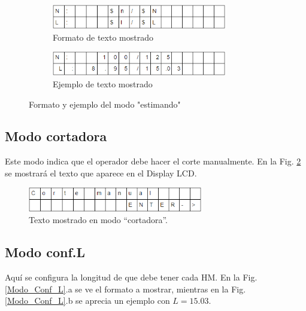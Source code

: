 \documentclass[main_conf.tex]{subfiles}
\begin{document}
\begin{figure}[t]
  \centering
  \begin{subfigure}[b]{0.5\textwidth}
    \centering
    \includegraphics[width=3.0in]{../img/modo/estimando_view.png}
    \caption{Formato de texto mostrado}
  \end{subfigure}

  \begin{subfigure}[b]{0.5\textwidth}
    \centering
    \includegraphics[width=3.0in]{../img/modo/estimando_sample.png}
    \caption{Ejemplo de texto mostrado}
  \end{subfigure}

  \caption{Formato y ejemplo del modo "estimando"}
  \label{Modo_estimando}
\end{figure}

\subsection{Modo cortadora}
Este modo indica que el operador debe hacer el corte manualmente.
En la Fig. \ref{Modo_cortadora} se mostrará el texto que
aparece en el Display LCD.

\begin{figure}[!t]
  \centering
  \includegraphics[width=3.0in]{../img/modo/cortadora.png}
  \caption{Texto mostrado en modo “cortadora”.}
  \label{Modo_cortadora}
\end{figure}

\subsection{Modo conf.L}
Aquí se configura la longitud de que debe tener cada HM.
En la Fig. \ref{Modo_Conf_L}.a se ve el formato a mostrar,
mientras en la Fig. \ref{Modo_Conf_L}.b se aprecia un
ejemplo con $L = 15.03$.
\end{document}
